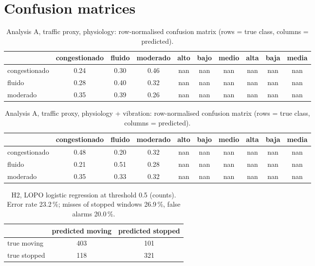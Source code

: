 \documentclass[runningheads]{llncs}
\begin{document}
\section{Confusion matrices}

\begin{table}[h]
\caption{Analysis A, traffic proxy, physiology: row-normalised confusion matrix (rows = true class, columns = predicted).}
\footnotesize\centering
\begin{tabular}{@{}lccccccccc@{}}
\toprule
 & congestionado & fluido & moderado & alto & bajo & medio & alta & baja & media\\
\midrule
congestionado & 0.24 & 0.30 & 0.46 & nan & nan & nan & nan & nan & nan\\
fluido & 0.28 & 0.40 & 0.32 & nan & nan & nan & nan & nan & nan\\
moderado & 0.35 & 0.39 & 0.26 & nan & nan & nan & nan & nan & nan\\
\bottomrule
\end{tabular}
\end{table}

\begin{table}[h]
\caption{Analysis A, traffic proxy, physiology + vibration: row-normalised confusion matrix (rows = true class, columns = predicted).}
\footnotesize\centering
\begin{tabular}{@{}lccccccccc@{}}
\toprule
 & congestionado & fluido & moderado & alto & bajo & medio & alta & baja & media\\
\midrule
congestionado & 0.48 & 0.20 & 0.32 & nan & nan & nan & nan & nan & nan\\
fluido & 0.21 & 0.51 & 0.28 & nan & nan & nan & nan & nan & nan\\
moderado & 0.35 & 0.33 & 0.32 & nan & nan & nan & nan & nan & nan\\
\bottomrule
\end{tabular}
\end{table}

\begin{table}[h]
\caption{H2, LOPO logistic regression at threshold 0.5 (counts). Error rate 23.2\,\%; misses of stopped windows 26.9\,\%, false alarms 20.0\,\%.}
\footnotesize\centering
\begin{tabular}{@{}lcc@{}}
\toprule
 & predicted moving & predicted stopped\\
\midrule
true moving & 403 & 101\\
true stopped & 118 & 321\\
\bottomrule
\end{tabular}
\end{table}
\end{document}
